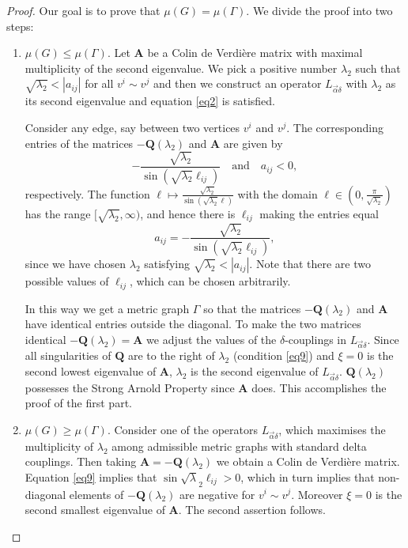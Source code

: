 \documentclass[10pt,a4paper]{amsart}
\begin{document}
\begin{proof}
Our goal is to prove that $ \mu(G) = \mu (\Gamma) $. We divide the proof into two steps:
\begin{enumerate}
\item $ \mu (G) \leq \mu (\Gamma) .$
Let $\mathbf{A}$ be a Colin de Verdi{\`e}re matrix with maximal multiplicity of the second eigenvalue. We pick a positive number $\lambda_2$ such that $\sqrt{\lambda_2}<|a_{ij}|$ for all $v^i\sim v^j$ and then we 
construct an operator $L_{\vec{\alpha} \delta}$ with $\lambda_2$ as its second eigenvalue and equation \eqref{eq2} is satisfied. 


Consider any edge, say between two vertices $ v^i $ and $ v^j $. The corresponding entries of the matrices $ - \mathbf Q (\lambda_2) $ and $ \mathbf A $ are given by
$$ -\frac{\sqrt{\lambda_2}}{\sin(\sqrt{\lambda_2} \ell_{ij})} \quad \mbox{and} \quad a_{ij} < 0,$$
respectively.
The function $ \ell \mapsto \frac{\sqrt{\lambda_2}}{\sin(\sqrt{\lambda_2} \ell )}$ with  the domain $\ell \in (0,\frac{\pi}{\sqrt{\lambda_2}})$ has the range $[\sqrt{\lambda_2},\infty)$, and  
hence there is $ \ell_{ij} $ making the entries equal
\begin{equation} \label{equal}
a_{ij} = -\frac{\sqrt{\lambda_2}}{\sin(\sqrt{\lambda_2} \ell_{ij})} ,
\end{equation}
 since we have chosen $ \lambda_2 $ satisfying $\sqrt{\lambda_2}<|a_{ij}|$.
Note that there are two possible values of $ \ell_{ij} $, which can be chosen arbitrarily.


In this way we get a metric graph $ \Gamma $ so that
the matrices $-\mathbf{Q}(\lambda_2)$ and $\mathbf{A}$ have identical entries outside the diagonal. 
To make the two matrices identical $-\mathbf{Q}(\lambda_2)=\mathbf{A}$
we adjust 
the values of  the $\delta$-couplings in $ L_{\vec{\alpha}\delta}$.
Since all singularities of $ \mathbf{Q}$ are to the right of $ \lambda_2$
(condition \eqref{eq9}) and $\xi=0$ is the second lowest eigenvalue of $\mathbf{A}$, $\lambda_2$ is the second eigenvalue of $ L_{\vec{\alpha} \delta}$. $ \mathbf{Q}(\lambda_2)$ possesses the Strong Arnold 
Property since $\mathbf{A}$ does. This accomplishes the proof of the first part.

\item $ \mu (G) \geq \mu(\Gamma) .$ Consider one of the operators $ L_{\vec{\alpha}\delta}$, which maximises 
the multiplicity of $ \lambda_2 $ among admissible metric graphs with standard delta couplings. Then taking
$ \mathbf{A} =  - \mathbf Q(\lambda_2) $
we obtain a Colin de Verdi{\`e}re matrix.
Equation \eqref{eq9}
 implies that $ \sin \sqrt{\lambda}_2 \ell_{ij} >0 $, which in turn implies that non-diagonal elements of $ -\mathbf Q(\lambda_2) $
 are negative for $ v^i \sim v^j$. Moreover $ \xi = 0 $ is the second smallest
eigenvalue of $ \mathbf{A}$. The second assertion follows.

\end{enumerate}

\end{proof}
\end{document}
